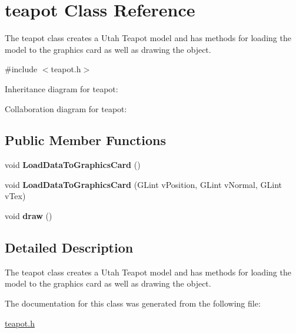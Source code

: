 \hypertarget{classteapot}{}\section{teapot Class Reference}
\label{classteapot}


The teapot class creates a Utah Teapot model and has methods for loading the model to the graphics card as well as drawing the object.  




{\ttfamily \#include $<$teapot.\+h$>$}



Inheritance diagram for teapot\+:


Collaboration diagram for teapot\+:
\subsection*{Public Member Functions}
\begin{DoxyCompactItemize}
\item 
\mbox{\label{classteapot_aa7d30882fd476691f850ea741897fbc4}} 
void {\bfseries Load\+Data\+To\+Graphics\+Card} ()
\item 
\mbox{\label{classteapot_ab5c4e7beb43b03679b03440bb73b2484}} 
void {\bfseries Load\+Data\+To\+Graphics\+Card} (G\+Lint v\+Position, G\+Lint v\+Normal, G\+Lint v\+Tex)
\item 
\mbox{\label{classteapot_afdba377cf910adf7f11fd40b8a8fc237}} 
void {\bfseries draw} ()
\end{DoxyCompactItemize}


\subsection{Detailed Description}
The teapot class creates a Utah Teapot model and has methods for loading the model to the graphics card as well as drawing the object. 

The documentation for this class was generated from the following file\+:\begin{DoxyCompactItemize}
\item 
\hyperlink{teapot_8h}{teapot.\+h}\end{DoxyCompactItemize}
